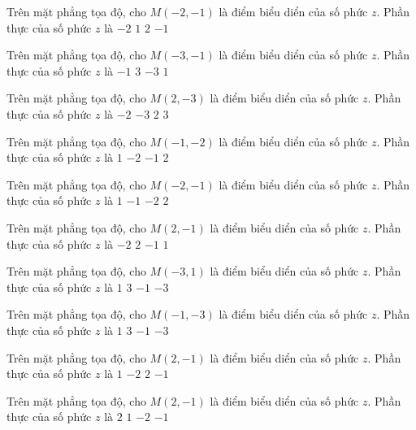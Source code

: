 \begin{ex}
 Trên mặt phẳng tọa độ, cho $M(-2,-1)$ là điểm biểu diển của số phức $z$. Phần thực của số phức $z$ là
\choice
{\True $-2$}
{$1$}
{$2$}
{$-1$}
\end{ex}
\begin{ex}
 Trên mặt phẳng tọa độ, cho $M(-3,-1)$ là điểm biểu diển của số phức $z$. Phần thực của số phức $z$ là
\choice
{$-1$}
{$3$}
{\True $-3$}
{$1$}
\end{ex}
\begin{ex}
 Trên mặt phẳng tọa độ, cho $M(2,-3)$ là điểm biểu diển của số phức $z$. Phần thực của số phức $z$ là
\choice
{$-2$}
{$-3$}
{\True $2$}
{$3$}
\end{ex}
\begin{ex}
 Trên mặt phẳng tọa độ, cho $M(-1,-2)$ là điểm biểu diển của số phức $z$. Phần thực của số phức $z$ là
\choice
{$1$}
{$-2$}
{\True $-1$}
{$2$}
\end{ex}
\begin{ex}
 Trên mặt phẳng tọa độ, cho $M(-2,-1)$ là điểm biểu diển của số phức $z$. Phần thực của số phức $z$ là
\choice
{$1$}
{$-1$}
{\True $-2$}
{$2$}
\end{ex}
\begin{ex}
 Trên mặt phẳng tọa độ, cho $M(2,-1)$ là điểm biểu diển của số phức $z$. Phần thực của số phức $z$ là
\choice
{$-2$}
{\True $2$}
{$-1$}
{$1$}
\end{ex}
\begin{ex}
 Trên mặt phẳng tọa độ, cho $M(-3,1)$ là điểm biểu diển của số phức $z$. Phần thực của số phức $z$ là
\choice
{$1$}
{$3$}
{$-1$}
{\True $-3$}
\end{ex}
\begin{ex}
 Trên mặt phẳng tọa độ, cho $M(-1,-3)$ là điểm biểu diển của số phức $z$. Phần thực của số phức $z$ là
\choice
{$1$}
{$3$}
{\True $-1$}
{$-3$}
\end{ex}
\begin{ex}
 Trên mặt phẳng tọa độ, cho $M(2,-1)$ là điểm biểu diển của số phức $z$. Phần thực của số phức $z$ là
\choice
{$1$}
{$-2$}
{\True $2$}
{$-1$}
\end{ex}
\begin{ex}
 Trên mặt phẳng tọa độ, cho $M(2,-1)$ là điểm biểu diển của số phức $z$. Phần thực của số phức $z$ là
\choice
{\True $2$}
{$1$}
{$-2$}
{$-1$}
\end{ex}

